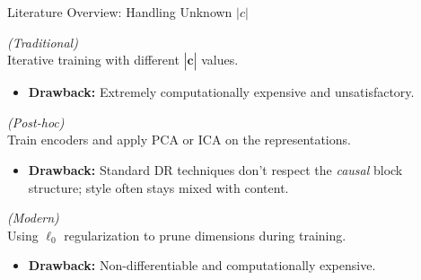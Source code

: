 \documentclass[a4paper,10pt]{beamer}
\begin{document}
\begin{frame}{Literature Overview: Handling Unknown $|c|$}
  \begin{description}
    \item<1->[\textbf{1. Heuristic Search}] \textit{(Traditional)} \\
      Iterative training with different $|\hat{\mathbf{c}}|$ values.
      \begin{itemize}
        \item \textbf{Drawback:} Extremely computationally expensive and unsatisfactory.
      \end{itemize}
    \item<2->[\textbf{2. Dimensionality Reduction}] \textit{(Post-hoc)} \\
      Train encoders and apply PCA or ICA on the representations.
      \begin{itemize}
        \item \textbf{Drawback:} Standard DR techniques don't respect the \textit{causal} block structure; style often stays mixed with content.
      \end{itemize}
    \item<3->[\textbf{3. Sparsity-Inducing Penalties}] \textit{(Modern)} \\
      Using $\ell_0$ regularization to prune dimensions during training.
      \begin{itemize}
        \item \textbf{Drawback:} Non-differentiable and computationally expensive.
      \end{itemize}
  \end{description}
\end{frame}
\end{document}
